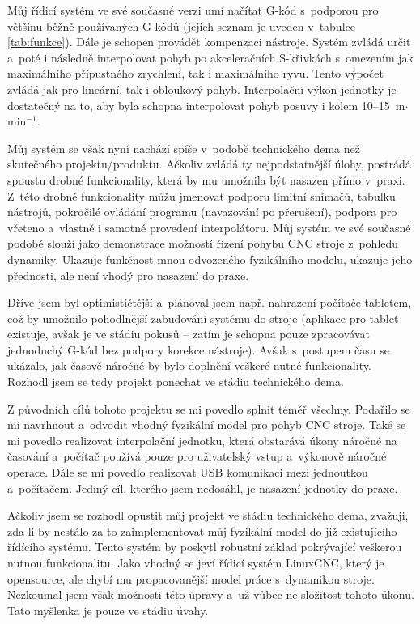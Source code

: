 Můj řídicí systém ve své současné verzi umí načítat G-kód s~podporou pro většinu běžně používaných G-kódů (jejich seznam je uveden v~tabulce \ref{tab:funkce}). Dále je schopen provádět kompenzaci nástroje. Systém zvládá určit a~poté i následně interpolovat pohyb po akceleračních S-křivkách s~omezením jak maximálního přípustného zrychlení, tak i maximálního ryvu. Tento výpočet zvládá jak pro lineární, tak i obloukový pohyb. Interpolační výkon jednotky je dostatečný na to, aby byla schopna interpolovat pohyb posuvy i kolem 10--15~m$\cdot$min$^{-1}$.

Můj systém se však nyní nachází spíše v~podobě technického dema než skutečného projektu/produktu. Ačkoliv zvládá ty nejpodstatnější úlohy, postrádá spoustu drobné funkcionality, která by mu umožnila být nasazen přímo v~praxi. Z~této drobné funkcionality můžu jmenovat podporu limitní snímačů, tabulku nástrojů, pokročilé ovládání programu (navazování po přerušení), podpora pro vřeteno a~vlastně i samotné provedení interpolátoru. Můj systém ve své současné podobě slouží jako demonstrace možností řízení pohybu CNC stroje z~pohledu dynamiky. Ukazuje funkčnost mnou odvozeného fyzikálního modelu, ukazuje jeho přednosti, ale není vhodý pro nasazení do praxe.

Dříve jsem byl optimističtější a~plánoval jsem např. nahrazení počítače tabletem, což by umožnilo pohodlnější zabudování systému do stroje (aplikace pro tablet existuje, avšak je ve stádiu pokusů -- zatím je schopna pouze zpracovávat jednoduchý G-kód bez podpory korekce nástroje). Avšak s~postupem času se ukázalo, jak časově náročné by bylo doplnění veškeré nutné funkcionality. Rozhodl jsem se tedy projekt ponechat ve stádiu technického dema.

Z původních cílů tohoto projektu se mi povedlo splnit téměř všechny. Podařilo se mi navrhnout a~odvodit vhodný fyzikální model pro pohyb CNC stroje. Také se mi povedlo realizovat interpolační jednotku, která obstarává úkony náročné na časování a~počítač používá pouze pro uživatelský vstup a~výkonově náročné operace. Dále se mi povedlo realizovat USB komunikaci mezi jednoutkou a~počítačem. Jediný cíl, kterého jsem nedosáhl, je nasazení jednotky do praxe.

Ačkoliv jsem se rozhodl opustit můj projekt ve stádiu technického dema, zvažuji, zda-li by nestálo za to zaimplementovat můj fyzikální model do již existujícího řídícího systému. Tento systém by poskytl robustní základ pokrývající veškerou nutnou funkcionalitu. Jako vhodný se jeví řídicí systém LinuxCNC, který je opensource\cite{linuxcnc}, ale chybí mu propacovanější model práce s~dynamikou stroje. Nezkoumal jsem však možnosti této úpravy a~už vůbec ne složitost tohoto úkonu. Tato myšlenka je pouze ve stádiu úvahy.